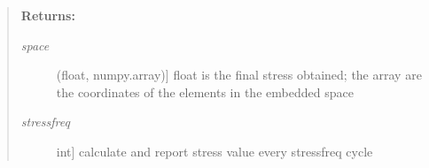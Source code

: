 \documentclass[letterpaper,10pt,english]{sphinxmanual}
\begin{document}
\begin{fulllineitems}
\begin{quote}
\begin{fulllineitems}
\begin{description}
\end{description}

\textbf{Returns:}
\begin{description}
\item[{\emph{space}}] \leavevmode{[}(float, numpy.array){]}
float is the final stress obtained; the array are the coordinates of the elements in the embedded space

\item[{\emph{stressfreq}}] \leavevmode{[}int{]}
calculate and report stress value every stressfreq cycle

\end{description}

\end{fulllineitems}

\end{quote}

\end{fulllineitems}
\end{document}
